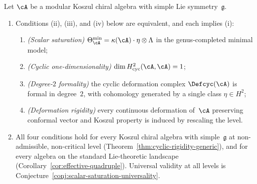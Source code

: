 \begin{proposition}
\label{prop:saturation-equivalence}
Let\/ $\cA$ be a modular Koszul chiral algebra with
simple Lie symmetry~$\mathfrak{g}$.
\begin{enumerate}[label=\textup{(\alph*)}]
\item Conditions
  \textup{(ii)},
  \textup{(iii)}, and
  \textup{(iv)} below are equivalent, and each implies
  \textup{(i)}:
\begin{enumerate}[label=\textup{(\roman*)}]
\item \emph{\textup{(}Scalar saturation\textup{)}}
  $\Theta_{\cA}^{\min} = \kappa(\cA)\cdot\eta\otimes\Lambda$
  in the genus-completed minimal model;
\item \emph{\textup{(}Cyclic one-dimensionality\textup{)}}
  $\dim H^2_{\mathrm{cyc}}(\cA, \cA) = 1$;
\item \emph{\textup{(}Degree-$2$ formality\textup{)}}
  the cyclic deformation complex $\Defcyc(\cA)$ is
  formal in degree~$2$, with cohomology generated by a
  single class $\eta \in H^2$;
\item \emph{\textup{(}Deformation rigidity\textup{)}}
  every continuous deformation of\/~$\cA$ preserving
  conformal vector and Koszul property is induced by
  rescaling the level.
\end{enumerate}
\item All four conditions hold for every
  Koszul chiral algebra with simple~$\mathfrak{g}$
  at non-admissible, non-critical level
  \textup{(}Theorem~\textup{\ref{thm:cyclic-rigidity-generic}}\textup{)},
  and for every algebra on the standard Lie-theoretic landscape
  \textup{(}Corollary~\textup{\ref{cor:effective-quadruple}}\textup{)}.
  Universal validity at all levels is
  Conjecture~\textup{\ref{conj:scalar-saturation-universality}}.
\end{enumerate}
\end{proposition}

